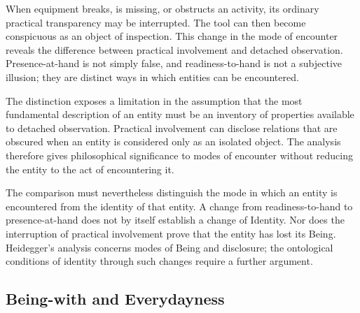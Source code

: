 \label{para:VS.B01.P01.C08.S11.SS06.P002}

When equipment breaks, is missing, or obstructs an
activity, its ordinary practical transparency may
be interrupted. The tool can then become conspicuous
as an object of inspection. This change in the mode
of encounter reveals the difference between practical
involvement and detached observation. Presence-at-hand
is not simply false, and readiness-to-hand is not
a subjective illusion; they are distinct ways in
which entities can be encountered.
\cite[§§16--18]{HeideggerBeingTime}

\label{para:VS.B01.P01.C08.S11.SS06.P003}

The distinction exposes a limitation in the assumption
that the most fundamental description of an entity
must be an inventory of properties available to
detached observation. Practical involvement can
disclose relations that are obscured when an entity
is considered only as an isolated object. The
analysis therefore gives philosophical significance
to modes of encounter without reducing the entity
to the act of encountering it.

\label{para:VS.B01.P01.C08.S11.SS06.P004}

The comparison must nevertheless distinguish the
mode in which an entity is encountered from the
identity of that entity. A change from readiness-to-hand
to presence-at-hand does not by itself establish
a change of Identity. Nor does the interruption
of practical involvement prove that the entity has
lost its Being. Heidegger's analysis concerns modes
of Being and disclosure; the ontological conditions
of identity through such changes require a further
argument.



\subsection{Being-with and Everydayness}
\label{subsec:ch08-heidegger-being-with}

\label{para:VS.B01.P01.C08.S11.SS07.P001}


